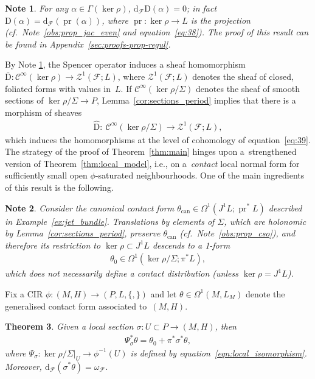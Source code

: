 \documentclass[10pt,a4paper]{amsart}
\numberwithin{equation}{section}
\newtheorem{Theorem}{Theorem}[section]
\newtheorem{Note}[Theorem]{Note}
\newcommand{\pr}{\operatorname{pr}}
\newcommand{\de}{\mathrm{d}} %
\newcommand{\CM}{(M,H)} %
\begin{document}
\begin{Note}\label{obs:sod}
For any $\alpha \in \Gamma(\ker \rho)$, $\de_{\mathcal{F}}\mathrm{D}(\alpha) = 0$; in fact $\mathrm{D}(\alpha) = \de_{\mathcal{F}}(\pr(\alpha))$, where $\pr \colon \ker \rho \to L$ is the projection (cf.\ Note~\ref{obs:prop_jac_even} and equation~\eqref{eq:38}). The proof of this result can be found in Appendix~\ref{sec:proofs-prop-regul}.
\end{Note}

By Note \ref{obs:sod}, the Spencer operator induces a sheaf homomorphism $\bar{\mathrm{D}} \colon \mathcal{C}^{\infty}(\ker \rho) \to \mathcal{Z}^1(\mathcal{F};L)$, where $\mathcal{Z}^1(\mathcal{F};L)$ denotes the sheaf of closed, foliated forms with values in~$L$. If $\mathcal{C}^{\infty}(\ker \rho/\Sigma)$ denotes the sheaf of smooth sections of $\ker \rho/\Sigma \to P$, Lemma~\ref{cor:sections_period} implies that
there is a morphism of sheaves
\begin{gather} \label{eq:20}
 \hat{\mathrm{D}} \colon \ \mathcal{C}^{\infty}(\ker \rho/\Sigma) \to \mathcal{Z}^{1}(\mathcal{F};L),
\end{gather}
which induces the homomorphisms at the level of cohomology of equation~\eqref{eq:39}. The strategy of the proof of Theorem~\ref{thm:main} hinges upon a~strengthened version of Theorem~\ref{thm:local_model}, i.e., on a~{\em contact} local normal form for suf\/f\/iciently small open $\phi$-saturated neighbourhoods. One of the main ingredients of this result is the following.

\begin{Note}\label{obs:contact form} Consider the canonical contact form $\theta_{\mathrm{can}}\in \Omega^1(J^1 L; \pr^* L)$ described in Example~\ref{ex:jet_bundle}. Translations by elements of $\Sigma$, which are holonomic by Lemma~\ref{cor:sections_period}, preserve $\theta_{\mathrm{can}}$ (cf.\ Note~\ref{obs:prop_cso}), and therefore its restriction to $\ker\rho\subset J^1L$ descends to a 1-form
 \begin{gather*}
 \theta_0\in \Omega^1(\ker\rho/\Sigma;\pi^*L),
 \end{gather*}
which does not necessarily def\/ine a contact distribution (unless $\ker\rho=J^1 L$).
\end{Note}

Fix a CIR $\phi\colon \CM \to (P,L,\{,\})$ and let $\theta \in \Omega^1(M,L_M)$ denote the generalised contact form associated to~$\CM$.

\begin{Theorem}\label{thm:aa} Given a local section $\sigma\colon U\subset P\to \CM$, then
 \begin{gather*}
 \Psi_\sigma^*\theta=\theta_0+\pi^*\sigma^*\theta,
 \end{gather*}
where $\Psi_\sigma\colon \ker \rho/\Sigma|_U\to \phi^{-1}(U)$ is defined by equation~\eqref{eqn:local_isomorphism}. Moreover, $\de_{\mathcal{F}} (\sigma^*\theta ) = \omega_{\mathcal{F}}$.
\end{Theorem}
\end{document}
